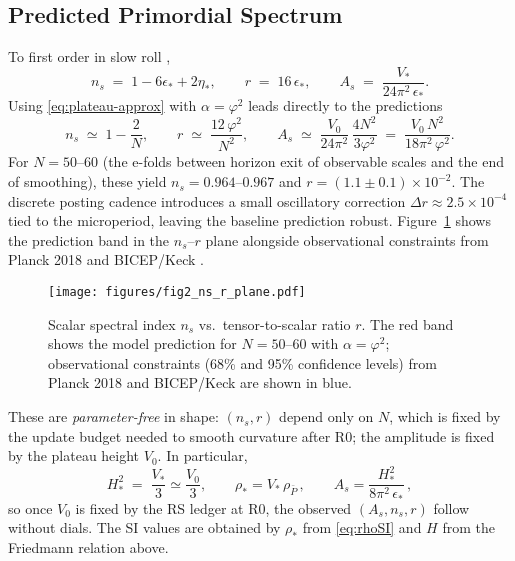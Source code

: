 \documentclass[11pt]{article}
\theoremstyle{definition}
\theoremstyle{remark}
\begin{document}
\subsection{Predicted Primordial Spectrum}
To first order in slow roll \citep{Dodelson2020},
\begin{equation}
  n_s \;=\; 1-6\epsilon_*+2\eta_*,
  \qquad
  r \;=\; 16\,\epsilon_*,
  \qquad
  A_s \;=\; \frac{V_*}{24\pi^2\,\epsilon_*}.
  \label{eq:sr-obs}
\end{equation}
Using \eqref{eq:plateau-approx} with \(\alpha=\varphi^2\) leads directly to the predictions
\begin{equation}
  n_s \;\simeq\; 1-\frac{2}{N},
  \qquad
  r \;\simeq\; \frac{12\,\varphi^2}{N^2},
  \qquad
  A_s \;\simeq\; \frac{V_0}{24\pi^2}\,\frac{4N^2}{3\varphi^2}
                \;=\; \frac{V_0\,N^2}{18\pi^2\,\varphi^2}.
  \label{eq:ns-r-As}
\end{equation}
For \(N=50\)--\(60\) (the e-folds between horizon exit of observable scales and the end of smoothing), these yield \(n_s = 0.964\)--\(0.967\) and \(r = (1.1 \pm 0.1)\times10^{-2}\). The discrete posting cadence introduces a small oscillatory correction \(\Delta r \approx 2.5\times10^{-4}\) tied to the microperiod, leaving the baseline prediction robust. Figure~\ref{fig:nsr} shows the prediction band in the \(n_s\)--\(r\) plane alongside observational constraints from Planck 2018 \citep{Planck2018} and BICEP/Keck \citep{BICEPKeck2021}.

\begin{figure}[htbp]
\centering
\texttt{[image: figures/fig2\_ns\_r\_plane.pdf]}
\caption{Scalar spectral index \(n_s\) vs.\ tensor-to-scalar ratio \(r\). The red band shows the model prediction for \(N=50\)--\(60\) with \(\alpha=\varphi^2\); observational constraints (68\% and 95\% confidence levels) from Planck 2018 and BICEP/Keck are shown in blue.}
\label{fig:nsr}
\end{figure}

These are \emph{parameter-free} in shape: \((n_s,r)\) depend only on \(N\), which is fixed by the update budget needed to smooth curvature after R0; the amplitude is fixed by the plateau height \(V_0\). In particular,
\begin{equation}
  H_*^2 \;=\; \frac{V_*}{3} \simeq \frac{V_0}{3}, 
  \qquad
  \rho_* = V_*\,\rho_{\bar P} \,,
  \qquad
  A_s = \frac{H_*^2}{8\pi^2\,\epsilon_*} \,,
  \label{eq:As-H}
\end{equation}
so once \(V_0\) is fixed by the RS ledger at R0, the observed \((A_s,n_s,r)\) follow without dials. The SI values are obtained by \(\rho_*\) from \eqref{eq:rhoSI} and \(H\) from the Friedmann relation above.
\end{document}
